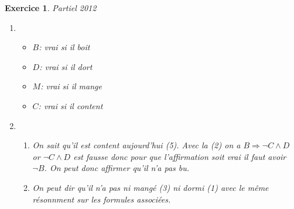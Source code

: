 \documentclass{article}
\theoremstyle{plain}
\newtheorem{exo}{Exercice}%
\begin{document}
\begin{exo} Partiel 2012
\begin{enumerate}
    \item \begin{itemize}
        \item $B$: vrai si il boit
        \item $D$: vrai si il dort
        \item $M$: vrai si il mange
        \item $C$: vrai si il content
    \end{itemize}

    \item
    \begin{enumerate}
        \item  On sait qu'il est content aujourd'hui (5). Avec la (2) on 
            a $B \Rightarrow \neg C \wedge D$ or $\neg C \wedge D$ est fausse
            donc pour que l'affirmation soit vrai il faut avoir $\neg B$.
            On peut donc affirmer qu'il n'a pas bu.

        \item On peut dir qu'il n'a pas ni mangé (3) ni dormi (1) avec le même 
            résonnment sur les formules associées.
    \end{enumerate}
\end{enumerate}
\end{exo}
\end{document}
